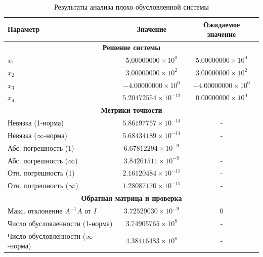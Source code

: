 \documentclass[12pt, a4paper]{article}
\begin{document}
\begin{table}[h]
\centering
\caption{Результаты анализа плохо обусловленной системы}
\begin{tabular}{|l|c|c|}
\hline
\textbf{Параметр} & \textbf{Значение} & \textbf{Ожидаемое значение} \\
\hline
\multicolumn{3}{|c|}{\textbf{Решение системы}} \\
\hline
$x_1$ & $5.00000000 \times 10^0$ & $5.00000000 \times 10^0$ \\
$x_2$ & $3.00000000 \times 10^2$ & $3.00000000 \times 10^2$ \\
$x_3$ & $-4.00000000 \times 10^0$ & $-4.00000000 \times 10^0$ \\
$x_4$ & $5.20472554 \times 10^{-12}$ & $0.00000000 \times 10^0$ \\
\hline
\multicolumn{3}{|c|}{\textbf{Метрики точности}} \\
\hline
Невязка (1-норма) & $5.86197757 \times 10^{-14}$ & - \\
Невязка ($\infty$-норма) & $5.68434189 \times 10^{-14}$ & - \\
Абс. погрешность (1) & $6.67812294 \times 10^{-9}$ & - \\
Абс. погрешность ($\infty$) & $3.84261511 \times 10^{-9}$ & - \\
Отн. погрешность (1) & $2.16120484 \times 10^{-11}$ & - \\
Отн. погрешность ($\infty$) & $1.28087170 \times 10^{-11}$ & - \\
\hline
\multicolumn{3}{|c|}{\textbf{Обратная матрица и проверка}} \\
\hline
Макс. отклонение $A^{-1}A$ от $I$ & $3.72529030 \times 10^{-9}$ & 0 \\
Число обусловленности (1-норма) & $3.74905765 \times 10^8$ & - \\
Число обусловленности ($\infty$-норма) & $4.38116483 \times 10^8$ & - \\
\hline
\end{tabular}
\end{table}
\end{document}
